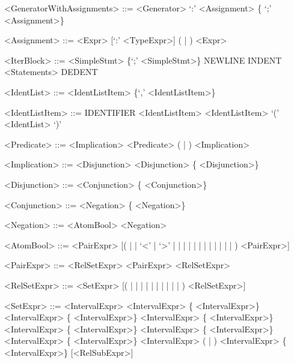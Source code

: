 \documentclass{article}
\newcommand{\concat}{%
  \mathbin{{+}\mspace{-8mu}{+}}%
}
\begin{document}
\begin{grammar}
<GeneratorWithAssignments> ::= <Generator> `:' <Assignment> \{ `;' <Assignment>\}

<Assignment> ::= <Expr> [`:' <TypeExpr>] (\lit{$\coloneqq$} | \lit{$:\in$}) <Expr>

<IterBlock> ::= <SimpleStmt> \{`;' <SimpleStmt>\}
    \alt NEWLINE INDENT <Statements> DEDENT

<IdentList> ::= <IdentListItem> \{`,' <IdentListItem>\}

<IdentListItem> ::= IDENTIFIER
    \alt <IdentListItem> \lit{$\mapsto$} <IdentListItem>
    \alt `(' <IdentList> `)'

<Predicate> ::= <Implication>
    \alt <Predicate> (\lit{$\equiv$} | \lit{$\not\equiv$}) <Implication>

<Implication> ::= <Disjunction>
    \alt <Disjunction> \{\lit{$\Rightarrow$} <Disjunction>\}

<Disjunction> ::= <Conjunction> \{\lit{$\lor$} <Conjunction>\}

<Conjunction> ::= <Negation> \{\lit{$\land$} <Negation>\}

<Negation> ::= <AtomBool>
    \alt \lit{$\lnot$} <Negation>

<AtomBool> ::= <PairExpr> [(
        \lit{$=$}
      | \lit{$\neq$}
      | `<'
      | `>'
      | \lit{$\leq$}
      | \lit{$\geq$}
      | \lit{$\in$}
      | \lit{$\not\in$}
      | \lit{$\subset$}
      | \lit{$\subseteq$}
      | \lit{$\supset$}
      | \lit{$\supseteq$}
      | \lit{$\not\subset$}
      | \lit{$\not\subseteq$}
      | \lit{$\not\supset$}
      | \lit{$\not\supseteq$}
    ) <PairExpr>]

<PairExpr> ::= <RelSetExpr>
    \alt <PairExpr> \lit{$\mapsto$} <RelSetExpr>

<RelSetExpr> ::= <SetExpr> [(
      \lit{$\rel$}
    | \lit{$\trel$}
    | \lit{$\srel$}
    | \lit{$\strel$}
    | \lit{$\pfun$}
    | \lit{$\tfun$}
    | \lit{$\pinj$}
    | \lit{$\tinj$}
    | \lit{$\psur$}
    | \lit{$\tsur$}
    | \lit{$\tbij$}
) <RelSetExpr>]

<SetExpr> ::= <IntervalExpr>
    \alt <IntervalExpr> \{\lit{$\cup$} <IntervalExpr>\}
    \alt <IntervalExpr> \{\lit{$\times$} <IntervalExpr>\}
    \alt <IntervalExpr> \{\lit{$\oplus$} <IntervalExpr>\}
    \alt <IntervalExpr> \{\lit{$\circ$} <IntervalExpr>\}
    \alt <IntervalExpr> \{\lit{$\cap$} <IntervalExpr>\}
    \alt <IntervalExpr> \{\lit{$\concat$} <IntervalExpr>\}
    \alt <IntervalExpr> (\lit{$\domsub$} | \lit{$\domres$}) <IntervalExpr> \{\lit{$\cap$} <IntervalExpr>\} [<RelSubExpr>]


\end{grammar}
\end{document}
